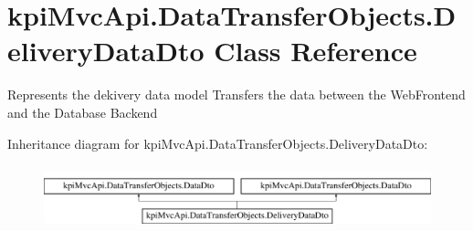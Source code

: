 \hypertarget{classkpi_mvc_api_1_1_data_transfer_objects_1_1_delivery_data_dto}{}\section{kpi\+Mvc\+Api.\+Data\+Transfer\+Objects.\+Delivery\+Data\+Dto Class Reference}
\label{classkpi_mvc_api_1_1_data_transfer_objects_1_1_delivery_data_dto}


Represents the dekivery data model Transfers the data between the Web\+Frontend and the Database Backend  


Inheritance diagram for kpi\+Mvc\+Api.\+Data\+Transfer\+Objects.\+Delivery\+Data\+Dto\+:\begin{figure}[H]
\begin{center}
\leavevmode
\includegraphics[height=1.879195cm]{classkpi_mvc_api_1_1_data_transfer_objects_1_1_delivery_data_dto}
\end{center}
\end{figure}
